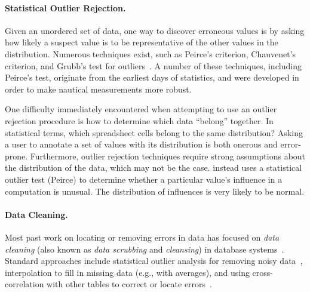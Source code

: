 
\paragraph{Statistical Outlier Rejection.}
Given an unordered set of data, one way to discover erroneous values is by asking how likely a suspect value is to be representative of the other values in the distribution.  Numerous techniques exist, such as Peirce's criterion, Chauvenet's criterion, and Grubb's test for outliers~\cite{FIXME}.  A number of these techniques, including Peirce's test, originate from the earliest days of statistics, and were developed in order to make nautical measurements more robust.

One difficulty immediately encountered when attempting to use an outlier rejection procedure is how to determine which data ``belong'' together.  In statistical terms, which spreadsheet cells belong to the same distribution?  Asking a user to annotate a set of values with its distribution is both onerous and error-prone.  Furthermore, outlier rejection techniques require strong assumptions about the distribution of the data, which may not be the case.  \checkcell instead uses a statistical outlier test (Peirce) to determine whether a particular value's influence in a computation is unusual.  The distribution of influences is very likely to be normal.

\paragraph{Data Cleaning.}
Most past work on locating or removing errors in data has focused
on \emph{data cleaning} (also known as \emph{data scrubbing}
and \emph{cleansing}) in database
systems~\cite{DBLP:journals/debu/RahmD00,han2006data}. Standard
approaches include statistical outlier analysis for removing noisy
data~\cite{1583581}, interpolation to fill in missing data (e.g., with
averages), and using cross-correlation with other tables to correct or
locate errors~\cite{Hernandez:1995:MPL:223784.223807}.




